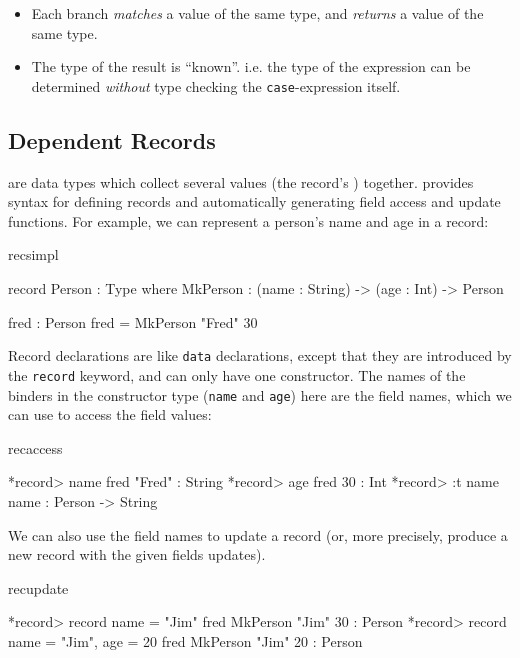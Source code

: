 \begin{itemize}
\item Each branch \emph{matches} a value of the same type, and \emph{returns} a
value of the same type.
\item The type of the result is ``known''. i.e. the type of the expression can be
determined \emph{without} type checking the \texttt{case}-expression itself. 
\end{itemize}

\subsection{Dependent Records}

 are data types which collect several values (the record's
) together. \Idris{} provides syntax for defining records and
automatically generating field access and update functions. For example, we
can represent a person's name and age in a record:

\begin{SaveVerbatim}{recsimpl}

record Person : Type where
    MkPerson : (name : String) ->
               (age : Int) -> Person

fred : Person
fred = MkPerson "Fred" 30

\end{SaveVerbatim}

\noindent
Record declarations are like \texttt{data} declarations, except that they are 
introduced by the \texttt{record} keyword, and can only have one constructor.
The names of the binders in the constructor type (\texttt{name} and \texttt{age})
here are the field names, which we can use to access the field values:

\begin{SaveVerbatim}{recaccess}

*record> name fred
"Fred" : String
*record> age fred
30 : Int
*record> :t name
name : Person -> String

\end{SaveVerbatim}

\noindent
We can also use the field names to update a record (or, more precisely, produce a
new record with the given fields updates).

\begin{SaveVerbatim}{recupdate}

*record> record { name = "Jim" } fred
MkPerson "Jim" 30 : Person
*record> record { name = "Jim", age = 20 } fred
MkPerson "Jim" 20 : Person

\end{SaveVerbatim}

